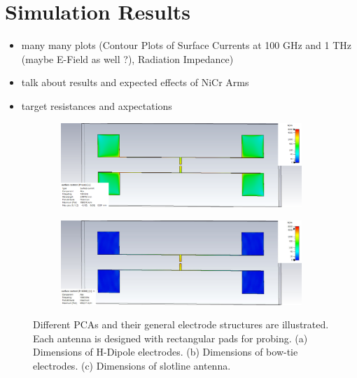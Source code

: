 \documentclass[
	german,%
	accentcolor=9c,%
	ruledheaders=section,%
	class=report,%
	thesis={type=bachelor},%
	fontsize=11pt,%
	parskip=half-,%
	custommargins=false,%
	marginpar=false,%
	BCOR=5mm,%
 	logofile=tools/logo-installation/TUDa-logos/tuda_logo.png,%
]{tudapub}
\begin{document}
\section{Simulation Results}
\begin{itemize}
	\item many many plots (Contour Plots of Surface Currents at 100 GHz and 1 THz (maybe E-Field as well ?),
	Radiation Impedance)
	\item talk about results and expected effects of NiCr Arms 
	\item target resistances and axpectations
\end{itemize}

\begin{figure}[h]
    \centering
    \hfill
    \begin{subfigure}[b]{1\textwidth}
        \centering
        \includegraphics[width=\textwidth]{figures/contour_plots/Contour_ref_0.1THz_SC.pdf}
        \caption{}
        \label{contour_ref_100GHz}
    \end{subfigure}
    \hfill
    \begin{subfigure}[b]{1\textwidth}
        \centering
        \includegraphics[width=\textwidth]{figures/contour_plots/Contour_ref_1THz_SC.pdf}
        \caption{}
        \label{contour_ref_1THz}
    \end{subfigure}
    \caption{Different PCAs and their general electrode structures are illustrated. Each antenna is designed with rectangular pads for probing. (a) Dimensions of H-Dipole electrodes. (b) Dimensions of bow-tie electrodes. (c) Dimensions of slotline antenna.}
    \label{electrodes_main}
\end{figure}
\end{document}
